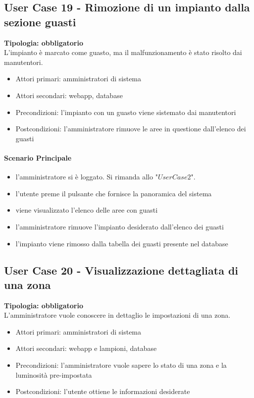 \documentclass[12pt]{article}
\begin{document}
\subsection{User Case 19 - Rimozione di un impianto dalla sezione guasti}
\textbf{Tipologia: obbligatorio} \\
L'impianto è marcato come guasto, ma il malfunzionamento è stato risolto dai manutentori.
\begin{itemize}
	\item Attori primari: amministratori di sistema
	\item Attori secondari: webapp, database
	\item Precondizioni: l'impianto con un guasto viene sistemato dai manutentori
	\item Postcondizioni: l'amministratore rimuove le aree in questione dall'elenco dei guasti
\end{itemize}
\paragraph{Scenario Principale}
\begin{itemize}
	\item l'amministratore si è loggato. Si rimanda allo "$User Case 2$".
	\item l'utente preme il pulsante che fornisce la panoramica del sistema
	\item viene visualizzato l'elenco delle aree con guasti
	\item l'amministratore rimuove l'impianto desiderato dall'elenco dei guasti
	\item l'impianto viene rimosso dalla tabella dei guasti presente nel database
\end{itemize}

\subsection{User Case 20 - Visualizzazione dettagliata di una zona}
\textbf{Tipologia: obbligatorio} \\
L'amministratore vuole conoscere in dettaglio le impostazioni di una zona.
\begin{itemize}
	\item Attori primari: amministratori di sistema
	\item Attori secondari: webapp e lampioni, database
	\item Precondizioni: l'amministratore vuole sapere lo stato di una zona e la luminosità pre-impostata
	\item Postcondizioni: l'utente ottiene le informazioni desiderate
\end{itemize}
\end{document}
